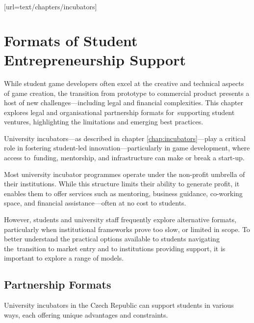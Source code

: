 [url=text/chapters/incubators]
\chapter{Formats of Student Entrepreneurship Support}\label{chap:support-formats}

\begin{chapterabstract}
    While student game developers often excel at the creative and technical aspects of game creation, the transition from prototype to commercial product presents a host of new challenges---including legal and financial complexities. This chapter explores legal and organisational partnership formats for~supporting student ventures, highlighting the limitations and emerging best practices.
\end{chapterabstract}

University incubators—as described in chapter \ref{chap:incubators}---play a critical role in fostering student-led innovation---particularly in game development, where access to~funding, mentorship, and infrastructure can make or break a start-up.

Most university incubator programmes operate under the non-profit umbrella of their institutions. While this structure limits their ability to generate profit, it enables them to offer services such as mentoring, business guidance, co-working space, and financial assistance---often at no cost to students.
\cite{uni-game-incubation, isis-innovation}

However, students and university staff frequently explore alternative formats, particularly when institutional frameworks prove too slow, or limited in scope. To better understand the practical options available to students navigating the~transition to market entry and to institutions providing support, it is important to explore a range of models.
\cite{uni-game-incubation, isis-innovation}

\section{Partnership Formats}\label{sec:partnership-formats}
University incubators in the Czech Republic can support students in various ways, each offering unique advantages and constraints.

